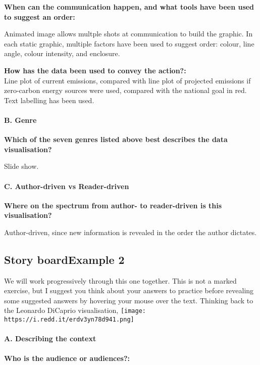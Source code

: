 \documentclass[]{article}
\let\oldparagraph\paragraph
\renewcommand{\paragraph}[1]{\oldparagraph{#1}\mbox{}}
\begin{document}
\textbf{When can the communication happen, and what tools have been used
to suggest an order:}

Animated image allows multple shots at communication to build the
graphic. In each static graphic, multiple factors have been used to
suggest order: colour, line angle, colour intensity, and enclosure.

\textbf{How has the data been used to convey the action?:}\\
Line plot of current emissions, compared with line plot of projected
emissions if zero-carbon energy sources were used, compared with the
national goal in red. Text labelling has been used.

\paragraph{B. Genre}\label{b.-genre}

\textbf{Which of the seven genres listed above best describes the data
visualisation?}

Slide show.

\paragraph{C. Author-driven vs
Reader-driven}\label{c.-author-driven-vs-reader-driven}

\textbf{Where on the spectrum from author- to reader-driven is this
visualisation?}

Author-driven, since new information is revealed in the order the author
dictates.

\subsection{Story boardExample 2}\label{story-boardexample-2}

We will work progressively through this one together. This is not a
marked exercise, but I suggest you think about your answers to practice
before revealing some suggested answers by hovering your mouse over the
text. Thinking back to the Leonardo DiCaprio visualisation,
\texttt{[image: https://i.redd.it/erdv3yn78d941.png]}

\paragraph{A. Describing the context}\label{a.-describing-the-context-1}

\textbf{Who is the audience or audiences?: }
\end{document}
